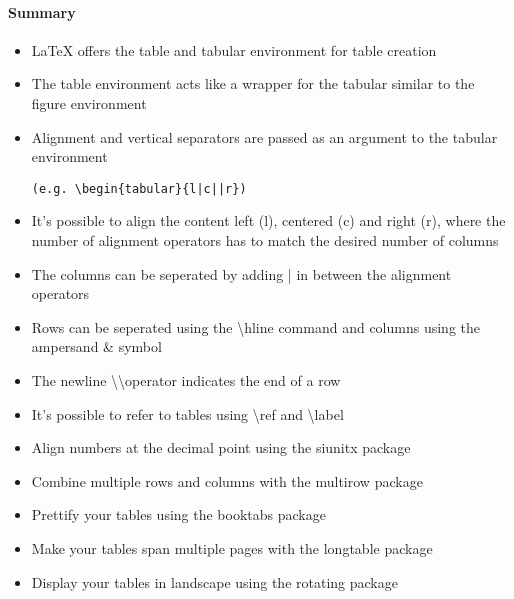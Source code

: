   \paragraph{Summary}
    \begin{itemize} %
      \item LaTeX offers the table and tabular environment for table creation
      \item The table environment acts like a wrapper for the tabular similar to the figure environment
      \item Alignment and vertical separators are passed as an argument to the tabular environment 
            \begin{verbatim}(e.g. \begin{tabular}{l|c||r}) \end{verbatim}
      \item It's possible to align the content left (l), centered (c) and right (r), where the number of alignment operators has to match the desired number of columns
      \item The columns can be seperated by adding | in between the alignment operators
      \item Rows can be seperated using the \textbackslash hline command and columns using the ampersand \& symbol
      \item The newline \textbackslash \textbackslash \enspace operator indicates the end of a row       
      \item It's possible to refer to tables using \textbackslash ref and \textbackslash label
      \item Align numbers at the decimal point using the siunitx package
      \item Combine multiple rows and columns with the multirow package
      \item Prettify your tables using the booktabs package
      \item Make your tables span multiple pages with the longtable package
      \item Display your tables in landscape using the rotating package
    \end{itemize} 
